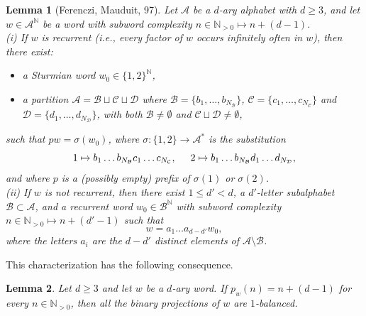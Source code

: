\documentclass{template_arxiv}
\newtheorem{lemma}{Lemma}%
\theoremstyle{definition}
\newcommand{\N}{\mathbb{N}}
\newcommand{\A}{\mathcal{A}}
\begin{document}
\begin{lemma}[Ferenczi, Mauduit, 97]\label{lemma:minimal_complexity}
Let $\A$ be a $d$-ary alphabet with $d\geq 3$, and let $w\in\A^\N$ be a word with subword complexity $n\in\N_{>0}\mapsto n+(d-1)$.\\
\emph{(i)} If $w$ is recurrent (\emph{i.e.}, every factor of $w$ occurs infinitely often in $w$), then there exist:
\begin{itemize}
    \vspace{-0.3cm}
    \item[-] a Sturmian word $w_0\in\{1,2\}^\N$,
    \vspace{-0.3cm}
    \item[-] a partition $\A=\mathcal{B}\sqcup\mathcal{C}\sqcup\mathcal{D}$ where $\mathcal{B}=\{b_1,\ldots,b_{N_{\mathcal{B}}}\}$, $\mathcal{C}=\{c_1,\ldots,c_{N_{\mathcal{C}}}\}$ and $\mathcal{D}=\{d_1,\ldots,d_{N_{\mathcal{D}}}\}$, with both $\mathcal{B}\neq\emptyset$ and $\mathcal{C}\sqcup\mathcal{D}\neq\emptyset$,
\end{itemize}
\vspace{-0.2cm}
such that $pw=\sigma(w_0)$, where $\sigma:\{1,2\}\to\A^*$ is the substitution
\[
    1\mapsto b_1\ldots b_{N_{\mathcal{B}}}c_1\ldots c_{N_{\mathcal{C}}}, \hspace{0.5cm} 2\mapsto b_1\ldots b_{N_{\mathcal{B}}}d_1\ldots d_{N_{\mathcal{D}}},
\]
and where $p$ is a (possibly empty) prefix of $\sigma(1)$ or $\sigma(2)$.\\
\emph{(ii)} If $w$ is not recurrent, then there exist $1\leq d'<d$, a $d'$-letter subalphabet $\mathcal{B}\subset\A$, and a recurrent word $w_0\in\mathcal{B}^\N$ with subword complexity $n\in\N_{>0}\mapsto n+(d'-1)$ such that
\[
    w=a_1\ldots a_{d-d'} w_0,
\]
where the letters $a_i$ are the $d-d'$ distinct elements of $\A\setminus\mathcal{B}$.
\end{lemma}

This characterization has the following consequence.

\begin{lemma}\label{lemma:minimal_complexityb}
Let $d\geq 3$ and let $w$ be a $d$-ary word. If $p_w(n)=n+(d-1)$ for every $n\in\N_{>0}$, then all the binary projections of $w$ are $1$-balanced.
\end{lemma}
\end{document}
